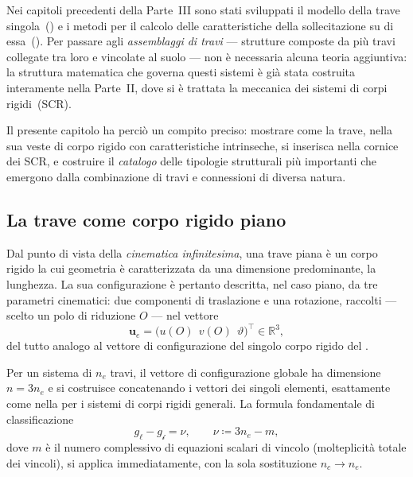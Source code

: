Nei capitoli precedenti della Parte~III sono stati sviluppati
il modello della trave singola~() e
i metodi per il calcolo delle caratteristiche della
sollecitazione su di essa~().
Per passare agli \emph{assemblaggi di travi} --- strutture
composte da più travi collegate tra loro e vincolate al suolo
--- non è necessaria alcuna teoria aggiuntiva: la struttura
matematica che governa questi sistemi è già stata costruita
interamente nella Parte~II, dove si è trattata la meccanica
dei sistemi di corpi rigidi~(SCR).

Il presente capitolo ha perciò un compito preciso: mostrare
come la trave, nella sua veste di corpo rigido con caratteristiche
intrinseche, si inserisca nella cornice dei SCR,
e costruire il \emph{catalogo} delle tipologie strutturali
più importanti che emergono dalla combinazione di travi e
connessioni di diversa natura.


\subsection{La trave come corpo rigido piano}
\label{subsec:trave_SCR}

Dal punto di vista della \emph{cinematica infinitesima},
una trave piana è un corpo rigido la cui geometria è
caratterizzata da una dimensione predominante, la lunghezza.
La sua configurazione è pertanto descritta, nel caso piano,
da tre parametri cinematici: due componenti di traslazione
e una rotazione, raccolti --- scelto un polo di riduzione
$O$ --- nel vettore
\begin{equation}
	\bm{u}_e
	=
	\bigl(
	u(O)\,\; v(O)\,\; \vartheta
	\bigr)^{\!\top}
	\in \mathbb{R}^{3},
\end{equation}
del tutto analogo al vettore di configurazione del singolo
corpo rigido del .

Per un sistema di $n_e$ travi, il vettore di configurazione
globale ha dimensione $n = 3n_e$ e si costruisce
concatenando i vettori dei singoli elementi, esattamente
come nella  per i sistemi di corpi
rigidi generali. La formula fondamentale di classificazione
\begin{equation}\label{eq:class_travi}
	g_\ell - g_{\mathscr{i}} = \nu, \qquad
	\nu \coloneqq 3n_e - m,
\end{equation}
dove $m$ è il numero complessivo di equazioni scalari di
vincolo (molteplicità totale dei vincoli), si applica
immediatamente, con la sola sostituzione $n_c \to n_e$.

